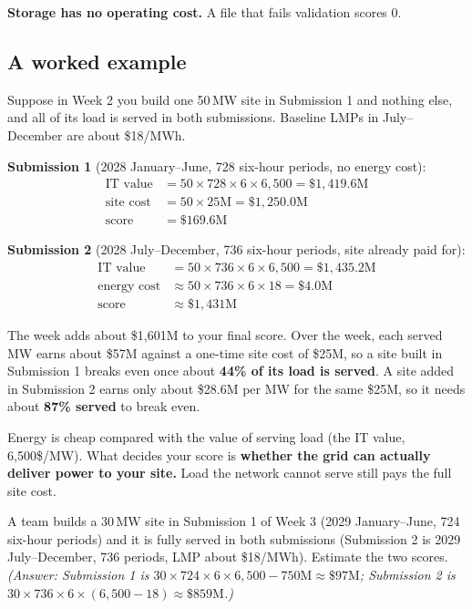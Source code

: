 \documentclass[10pt]{article}
\newcommand{\MW}{\ensuremath{\,\mathrm{MW}}}
\begin{document}
\textbf{Storage has no operating cost.} A file that fails validation scores 0.

\subsection{A worked example}\label{subsec:worked_example}
Suppose in Week 2 you build one 50\MW{} site in Submission 1 and nothing else,
and all of its load is served in both submissions. Baseline LMPs in July--December
are about \$18/MWh.

\textbf{Submission 1} (2028 January--June, 728 six-hour periods, no energy cost):
\begin{align*}
  \text{IT value}  &= 50 \times 728 \times 6 \times 6{,}500 = \$1{,}419.6\text{M}\\
  \text{site cost} &= 50 \times 25\text{M} = \$1{,}250.0\text{M}\\
  \text{score}     &= \$169.6\text{M}
\end{align*}

\textbf{Submission 2} (2028 July--December, 736 six-hour periods, site already paid for):
\begin{align*}
  \text{IT value}    &= 50 \times 736 \times 6 \times 6{,}500 = \$1{,}435.2\text{M}\\
  \text{energy cost} &\approx 50 \times 736 \times 6 \times 18 = \$4.0\text{M}\\
  \text{score}       &\approx \$1{,}431\text{M}
\end{align*}

The week adds about \$1,601M to your final score. Over the week, each served MW
earns about \$57M against a one-time site cost of \$25M, so a site built in
Submission 1 breaks even once about \textbf{44\% of its load is served}. A site
added in Submission 2 earns only about \$28.6M per MW for the same \$25M, so it
needs about \textbf{87\% served} to break even.

\begin{keybox}
Energy is cheap compared with the value of serving load (the IT value, 6,500\$/MW). What decides your score is \textbf{whether the grid can actually deliver power to your site.} Load the
network cannot serve still pays the full site cost.
\end{keybox}

\begin{exercisebox}
A team builds a 30\MW{} site in Submission 1 of Week 3 (2029 January--June,
724 six-hour periods) and it is fully served in both submissions (Submission 2
is 2029 July--December, 736 periods, LMP about \$18/MWh). Estimate the two
scores. \emph{(Answer: Submission 1 is $30 \times 724 \times 6 \times
6{,}500 - 750\text{M} \approx \$97\text{M}$; Submission 2 is
$30 \times 736 \times 6 \times (6{,}500 - 18) \approx \$859\text{M}$.)}
\end{exercisebox}
\end{document}
